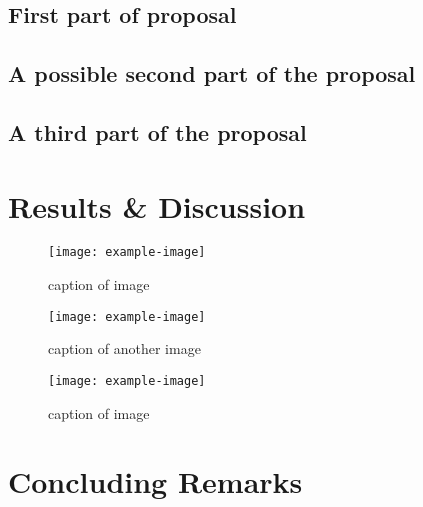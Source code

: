 \documentclass[11pt, letterpaper, oneside]{article}  %
\begin{document}
\subsection{First part of proposal}
\lipsum[47-50]
\subsection{A possible second part of the proposal}
\lipsum[47-50]
\subsection{A third part of the proposal}
\lipsum[60-65]
\newpage%


\section{Results \& Discussion}
\lipsum[41-47]

\begin{figure}[!ht]
    \center
    \texttt{[image: example-image]}
    \caption{\label{fig:one}caption of image}
\end{figure}

\lipsum[70-72]

\begin{figure}
    \center
    \texttt{[image: example-image]}
    \caption{\label{fig:two}caption of another image}
\end{figure}

\lipsum[70-72]

\begin{figure}[!h]
    \center
    \texttt{[image: example-image]}
    \caption{\label{fig:three}caption of image}
\end{figure}

\newpage%

\section{Concluding Remarks}
\lipsum[80-83]
\newpage%

\renewcommand*{\bibfont}{\scriptsize}
\printbibliography

\end{document}
